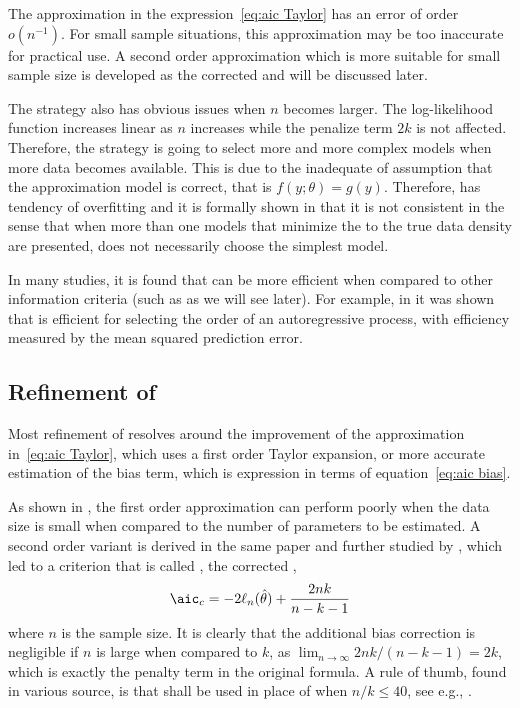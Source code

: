 The approximation in the expression~\ref{eq:aic Taylor} has an error of order
$o(n^{-1})$. For small sample situations, this approximation may be too
inaccurate for practical use. A second order approximation which is more
suitable for small sample size is developed as the corrected \aic and will be
discussed later.

The \aic strategy also has obvious issues when $n$ becomes larger. The
log-likelihood function increases linear as $n$ increases while the penalize
term $2k$ is not affected. Therefore, the \aic strategy is going to select
more and more complex models when more data becomes available. This is due to
the inadequate of assumption that the approximation model is correct, that is
$f(y;\theta) = g(y)$. Therefore, \aic has tendency of overfitting and it is
formally shown in \cite{Sin:1996vs} that it is not consistent in the sense
that when more than one models that minimize the \kl to the true data density
are presented, \aic does not necessarily choose the simplest model.

In many studies, it is found that \aic can be more efficient when compared to
other information criteria (such as \bic as we will see later). For example,
in \cite{Lee:2001tm} it was shown that \aic is efficient for selecting the
order of an autoregressive process, with efficiency measured by the mean
squared prediction error.

\subsection{Refinement of \protect\aic}
\label{sub:Refinement of aic}

Most refinement of \aic resolves around the improvement of the approximation
in~\ref{eq:aic Taylor}, which uses a first order Taylor expansion, or more
accurate estimation of the bias term, which is expression in terms of
equation~\eqref{eq:aic bias}.

As shown in \cite{Sugiura:1978be}, the first order approximation can perform
poorly when the data size is small when compared to the number of parameters
to be estimated. A second order variant is derived in the same paper and
further studied by \cite{Hurvich:1989ev}, which led to a criterion that is
called \aicc, the corrected \aic,
\begin{equation}
  \text{\aicc} = -2\ell_n(\hat\theta) + \frac{2nk}{n-k-1}
\end{equation}
where $n$ is the sample size. It is clearly that the additional bias
correction is negligible if $n$ is large when compared to $k$, as
$\lim_{n\to\infty}2nk/(n-k-1) = 2k$, which is exactly the penalty term in the
original \aic formula. A rule of thumb, found in various source, is that \aicc
shall be used in place of \aic when $n/k\le40$, see e.g.,
\cite[][sec.~2.4]{Burnham:2002wc}.

